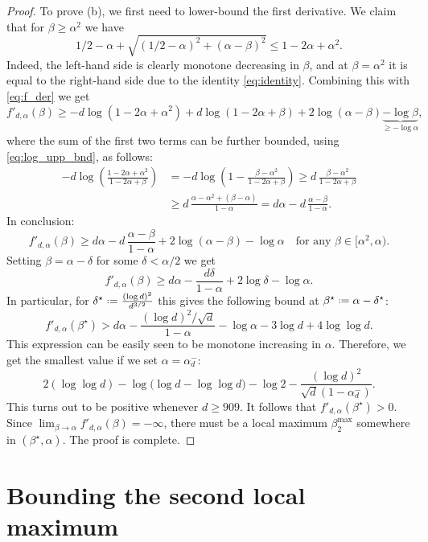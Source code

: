 \documentclass[12pt]{amsart}
\theoremstyle{definition}
\newcommand\al{\alpha}
\newcommand\be{\beta}
\newcommand\de{\delta}
\newcommand{\defeq}{\mathrel{\vcenter{\baselineskip0.5ex \lineskiplimit0pt
                     \hbox{\scriptsize.}\hbox{\scriptsize.}}}%
                     =}
\begin{document}
\begin{proof}
To prove (b), we first need to lower-bound the first derivative. We claim that for $\be \geq \al^2$ we have 
%
\[ 1/2-\al +\sqrt{(1/2-\al)^2+(\al-\be)^2} 
\leq 1-2\al+\al^2 .\]
%
Indeed, the left-hand side is clearly monotone decreasing in $\be$, and at $\be=\al^2$ it is equal to the right-hand side due to the identity \eqref{eq:identity}. Combining this with \eqref{eq:f_der} we get 
%
\[ f'_{d,\al}(\be) 
\geq -d \log(1-2\al+\al^2)+d \log(1-2\al+\be)
+2\log(\al-\be) 
\underbrace{-\log \be}_{\geq -\log \al} ,\]
%
where the sum of the first two terms can be further bounded, using \eqref{eq:log_upp_bnd}, as follows:
%
\begin{align*}
-d \log\left( \frac{1-2\al+\al^2}{1-2\al+\be} \right)
&= -d \log\left( 1 - \frac{\be-\al^2}{1-2\al+\be} \right) 
\geq d\,\frac{\be-\al^2}{1-2\al+\be} \\
&\geq d\,\frac{\al-\al^2+(\be-\al)}{1-\al} 
= d\al - d\,\frac{\al-\be}{1-\al} .
\end{align*} 
%
In conclusion:  
%
\begin{equation*} %
f'_{d,\al}(\be) 
\geq d\al - d\,\frac{\al-\be}{1-\al} + 2 \log(\al-\be)-\log \al
\quad \text{for any } \be \in [\al^2,\al) .
\end{equation*}
%
Setting $\be = \al-\de$ for some $\de<\al/2$ we get 
%
\[ f'_{d,\al}(\be) 
\geq d\al - \frac{d\de}{1-\al} + 2\log \de - \log \al .\]
%
In particular, for $\de^\star \defeq \frac{(\log d)^2}{d^{3/2}}$ this gives the following bound at $\be^\star \defeq \al-\de^\star$: 
%
\[ f'_{d,\al}(\be^\star) 
> d\al  - \frac{(\log d)^2/\sqrt{d}}{1-\al} 
- \log \al - 3\log d + 4 \log\log d .\]
%
This expression can be easily seen to be monotone increasing in $\al$. Therefore, we get the smallest value if we set $\al= \al_d^-$:
%
\[ 2(\log \log d) - \log\big( \log d 
- \log\log d \big) - \log 2 
- \frac{(\log d)^2}{\sqrt{d}(1-\al_d^-)} .\]
%
This turns out to be positive whenever $d \geq 909$. It follows that $f'_{d,\al}(\be^\star)>0$. Since $\lim_{\be\to\al} f'_{d,\al}(\be)=-\infty$, there must be a local maximum $\be_2^{\max}$ somewhere in $(\be^\star,\al)$. The proof is complete.
\end{proof}
%




\section{Bounding the second local maximum} \label{sec:second_max}
\end{document}
